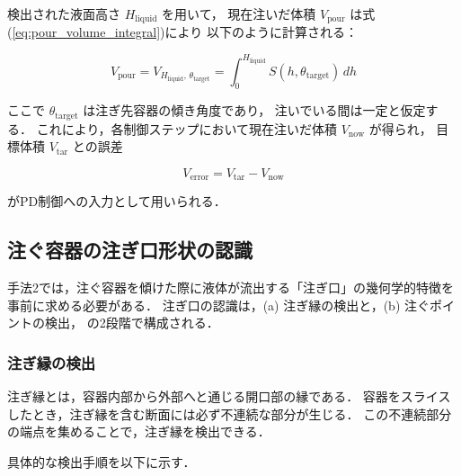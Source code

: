 検出された液面高さ $H_{\mathrm{liquid}}$ を用いて，
現在注いだ体積 $V_{\mathrm{pour}}$ は式(\ref{eq:pour_volume_integral})により
以下のように計算される：

\begin{equation}
  V_{\mathrm{pour}} = V_{H_{\mathrm{liquid}},\,\theta_{\mathrm{target}}}
  = \int_{0}^{H_{\mathrm{liquid}}} S(h,\theta_{\mathrm{target}})\,dh
\end{equation}

ここで $\theta_{\mathrm{target}}$ は注ぎ先容器の傾き角度であり，
注いでいる間は一定と仮定する．
これにより，各制御ステップにおいて現在注いだ体積 $V_{\mathrm{now}}$ が得られ，
目標体積 $V_{\mathrm{tar}}$ との誤差

\begin{equation}
  V_{\mathrm{error}} = V_{\mathrm{tar}} - V_{\mathrm{now}}
  \label{eq:pour_verror}
\end{equation}

がPD制御への入力として用いられる．

\subsection{注ぐ容器の注ぎ口形状の認識}
\label{sec:pour_edge_point}

手法2では，注ぐ容器を傾けた際に液体が流出する「注ぎ口」の幾何学的特徴を
事前に求める必要がある．
注ぎ口の認識は，(a) 注ぎ縁の検出と，(b) 注ぐポイントの検出，
の2段階で構成される．

\subsubsection{注ぎ縁の検出}

注ぎ縁とは，容器内部から外部へと通じる開口部の縁である．
容器をスライスしたとき，注ぎ縁を含む断面には必ず不連続な部分が生じる．
この不連続部分の端点を集めることで，注ぎ縁を検出できる．

具体的な検出手順を以下に示す．

